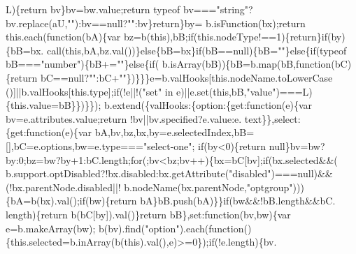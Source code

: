 \begin{DoxyCode}
      L)\{\textcolor{keywordflow}{return} bv\}bv=bw.value;\textcolor{keywordflow}{return} typeof bv===\textcolor{stringliteral}{"string"}?bv.replace(aU,\textcolor{stringliteral}{""}):bv==null?\textcolor{stringliteral}{""}:bv\}\textcolor{keywordflow}{return}\}by=
      b.isFunction(bx);\textcolor{keywordflow}{return} this.each(\textcolor{keyword}{function}(bA)\{var bz=b(\textcolor{keyword}{this}),bB;\textcolor{keywordflow}{if}(this.nodeType!==1)\{\textcolor{keywordflow}{return}\}\textcolor{keywordflow}{if}(by)\{bB=bx.
      call(\textcolor{keyword}{this},bA,bz.val())\}\textcolor{keywordflow}{else}\{bB=bx\}\textcolor{keywordflow}{if}(bB==null)\{bB=\textcolor{stringliteral}{""}\}\textcolor{keywordflow}{else}\{\textcolor{keywordflow}{if}(typeof bB===\textcolor{stringliteral}{"number"})\{bB+=\textcolor{stringliteral}{""}\}\textcolor{keywordflow}{else}\{\textcolor{keywordflow}{if}(
      b.isArray(bB))\{bB=b.map(bB,\textcolor{keyword}{function}(bC)\{\textcolor{keywordflow}{return} bC==null?\textcolor{stringliteral}{""}:bC+\textcolor{stringliteral}{""}\})\}\}\}e=b.valHooks[\textcolor{keyword}{this}.nodeName.toLowerCase
      ()]||b.valHooks[this.type];\textcolor{keywordflow}{if}(!e||!(\textcolor{stringliteral}{"set"} in e)||e.set(\textcolor{keyword}{this},bB,\textcolor{stringliteral}{"value"})===L)\{this.value=bB\}\})\}\});
      b.extend(\{valHooks:\{option:\{\textcolor{keyword}{get}:\textcolor{keyword}{function}(e)\{var bv=e.attributes.value;\textcolor{keywordflow}{return} !bv||bv.specified?e.value:e.
      text\}\},select:\{\textcolor{keyword}{get}:\textcolor{keyword}{function}(e)\{var bA,bv,bz,bx,by=e.selectedIndex,bB=[],bC=e.options,bw=e.type===\textcolor{stringliteral}{"select-one"};\textcolor{keywordflow}{
      if}(by<0)\{\textcolor{keywordflow}{return} null\}bv=bw?by:0;bz=bw?by+1:bC.length;\textcolor{keywordflow}{for}(;bv<bz;bv++)\{bx=bC[bv];\textcolor{keywordflow}{if}(bx.selected&&(
      b.support.optDisabled?!bx.disabled:bx.getAttribute(\textcolor{stringliteral}{"disabled"})===null)&&(!bx.parentNode.disabled||!
      b.nodeName(bx.parentNode,\textcolor{stringliteral}{"optgroup"})))\{bA=b(bx).val();\textcolor{keywordflow}{if}(bw)\{\textcolor{keywordflow}{return} bA\}bB.push(bA)\}\}\textcolor{keywordflow}{if}(bw&&!bB.length&&bC.
      length)\{\textcolor{keywordflow}{return} b(bC[by]).val()\}\textcolor{keywordflow}{return} bB\},set:\textcolor{keyword}{function}(bv,bw)\{var e=b.makeArray(bw);
      b(bv).find(\textcolor{stringliteral}{"option"}).each(\textcolor{keyword}{function}()\{this.selected=b.inArray(b(\textcolor{keyword}{this}).val(),e)>=0\});\textcolor{keywordflow}{if}(!e.length)\{bv.

\end{DoxyCode}
